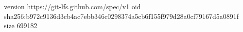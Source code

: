 version https://git-lfs.github.com/spec/v1
oid sha256:b972c9136d3cb4ac7ebb346c0298374a5cb6f155f979d28a0cf79167d5a0891f
size 699182
